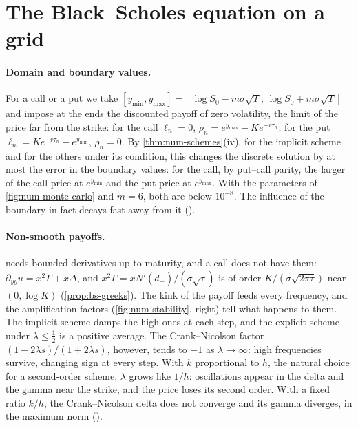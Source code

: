 
\section{The Black--Scholes equation on a grid}\label{sec:num-bs}

\paragraph{Domain and boundary values.} For a call or a put we take
$[y_{\min},y_{\max}]=[\log S_0-m\sigma\sqrt T,\,\log S_0+m\sigma\sqrt T]$ and impose at the ends the
discounted payoff of zero volatility, the limit of the price far from the strike: for the call
$\ell_n=0$, $\rho_n=e^{y_{\max}}-Ke^{-r\tau_n}$; for the put $\ell_n=Ke^{-r\tau_n}-e^{y_{\min}}$, $\rho_n=0$. By
\cref{thm:num-schemes}(iv), for the implicit scheme and for the others under its condition, this
changes the discrete solution by at most the error in the boundary values: for the call, by put--call
parity, the larger of the call price at $e^{y_{\min}}$ and the put price at $e^{y_{\max}}$. With the
parameters of \cref{fig:num-monte-carlo} and $m=6$, both are below $10^{-8}$. The influence of the
boundary in fact decays fast away from it (\textcite{kangro-nicolaides-2000}).

\paragraph{Non-smooth payoffs.}  needs bounded derivatives up to maturity, and
a call does not have them: $\partial_{yy}u=x^2\Gamma+x\Delta$, and $x^2\Gamma=xN'(d_+)/(\sigma\sqrt\tau)$ is of order
$K/(\sigma\sqrt{2\pi\tau})$ near $(0,\log K)$ (\cref{prop:bs-greeks}). The kink of the payoff feeds every
frequency, and the amplification factors (\cref{fig:num-stability}, right) tell what happens to them.
The implicit scheme damps the high ones at each step, and the explicit scheme under $\lambda\le\frac12$ is a
positive average. The Crank--Nicolson factor $(1-2\lambda s)/(1+2\lambda s)$, however, tends to $-1$ as
$\lambda\to\infty$: high frequencies survive, changing sign at every step. With $k$ proportional to $h$, the
natural choice for a second-order scheme, $\lambda$ grows like $1/h$: oscillations appear in the delta
and the gamma near the strike, and the price loses its second order. With a fixed ratio $k/h$, the
Crank--Nicolson delta does not converge and its gamma diverges, in the maximum norm
(\textcite{giles-carter-2006}).

